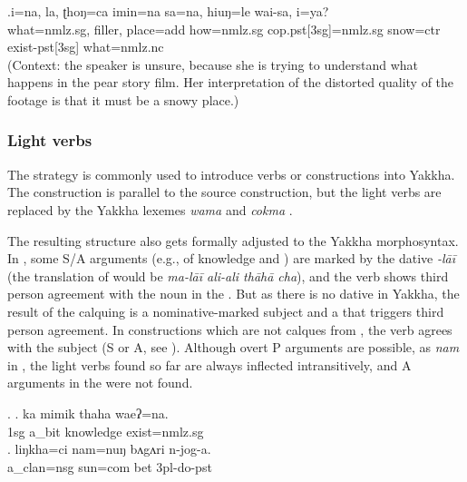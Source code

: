 \exg.i=na, la, ʈhoŋ=ca       imin=na       sa=na,        hiuŋ=le      wai-sa,  i=ya?\\
what{\sc =nmlz.sg}, {\sc filler}, place{\sc =add} how{\sc =nmlz.sg} {\sc cop.pst[3sg]=nmlz.sg} snow{\sc =ctr} exist{\sc -pst[3sg]} what{\sc =nmlz.nc}\\
 (Context: the speaker is unsure, because she is trying to understand what happens in the pear story film. Her interpretation of the distorted quality of the footage is that it must be a snowy place.)	

\subsubsection{Light verbs}

 The  strategy is commonly used to introduce  verbs or  constructions into Yakkha. The construction is parallel to the  source construction, but the  light verbs are replaced by the Yakkha lexemes \emph{wama}  and \emph{cokma} . 
 
 The resulting structure also gets formally adjusted to the Yakkha morphosyntax. In , some S/A arguments  (e.g., of knowledge and ) are marked by the dative \emph{-lāī} (the  translation of \Next[a] would be \emph{ma-lāī ali-ali thāhā cha}), and the verb shows third person agreement with the noun in the . But as there is no dative  in Yakkha, the result of the calquing is a nominative-marked subject and a  that triggers third person agreement. In  constructions which are not calques from , the verb agrees with the subject (S or A, see \Next[b]). Although overt P arguments are possible, as \emph{nam}   in \Next[b], the light verbs found so far are always inflected intransitively, and A arguments in the   were not found.

\ex. \ag. ka mimik   thaha       waeʔ=na.\\
		{\sc 1sg} a\_bit knowledge exist{\sc [3sg]=nmlz.sg}\\
	  
	\bg. liŋkha=ci     nam=nuŋ      bʌgʌri n-jog-a.\\
	a\_clan{\sc =nsg} sun{\sc =com} bet {\sc 3pl-}do{\sc -pst}\\
	 

